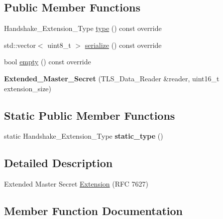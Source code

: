 \subsection*{Public Member Functions}
\begin{DoxyCompactItemize}
\item 
Handshake\+\_\+\+Extension\+\_\+\+Type \hyperlink{class_botan_1_1_t_l_s_1_1_extended___master___secret_a4e0c181be783e0c301c286ffacd682ef}{type} () const override
\item 
std\+::vector$<$ uint8\+\_\+t $>$ \hyperlink{class_botan_1_1_t_l_s_1_1_extended___master___secret_a5119fdc525bd8285fbd32ab6b7aa6daa}{serialize} () const override
\item 
bool \hyperlink{class_botan_1_1_t_l_s_1_1_extended___master___secret_ab7445933ce793c95ef1576bf35d1154c}{empty} () const override
\item 
\mbox{\label{class_botan_1_1_t_l_s_1_1_extended___master___secret_a492aa7fb2a0e0104192b1f3403fe4ed7}} 
{\bfseries Extended\+\_\+\+Master\+\_\+\+Secret} (T\+L\+S\+\_\+\+Data\+\_\+\+Reader \&reader, uint16\+\_\+t extension\+\_\+size)
\end{DoxyCompactItemize}
\subsection*{Static Public Member Functions}
\begin{DoxyCompactItemize}
\item 
\mbox{\label{class_botan_1_1_t_l_s_1_1_extended___master___secret_a025b81f11aac69297c1c68d3dd00c9af}} 
static Handshake\+\_\+\+Extension\+\_\+\+Type {\bfseries static\+\_\+type} ()
\end{DoxyCompactItemize}


\subsection{Detailed Description}
Extended Master Secret \hyperlink{class_botan_1_1_t_l_s_1_1_extension}{Extension} (R\+FC 7627) 

\subsection{Member Function Documentation}
\mbox{\label{class_botan_1_1_t_l_s_1_1_extended___master___secret_ab7445933ce793c95ef1576bf35d1154c}} 
